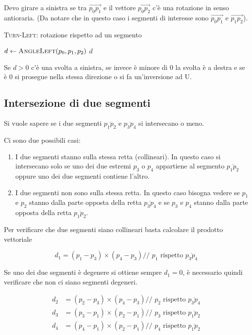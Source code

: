 Devo girare a sinistra se tra $\overrightarrow{p_0p_1}$ e il vettore $\overrightarrow{p_0p_2}$ c'è una rotazione in senso antioraria. (Da notare che in questo caso i segmenti di interesse sono $\overrightarrow{p_0p_1}$ e $\overrightarrow{p_1p_2}$).

\begin{breakablealgorithm}
	\caption{\textsc{Turn-Left}: rotazione rispetto ad un segmento}
	\begin{algorithmic}[1]
			\State $d \gets \textsc{AngleLeft}(p_0,p_1,p_2)$
			\State \Return $d$
		\EndFunction
	\end{algorithmic}
\end{breakablealgorithm}

Se $d >0 $ c'è una svolta a sinistra, se invece è minore di 0 la svolta è a destra e se è 0 si prosegue nella stessa direzione o si fa un'inversione ad U.

\subsection{Intersezione di due segmenti}\label{intersezione-di-due-segmenti}

Si vuole sapere se i due segmenti $\overline{p_1p_2}$ e $\overline{p_3p_4}$ si intersecano o meno.

Ci sono due possibili casi:

\begin{enumerate}
\item
  I due segmenti stanno sulla stessa retta (collineari). In questo caso si intersecano solo se uno dei due estremi $p_3$ o $p_4$ appartiene al segmento $\overline{p_1p_2}$ oppure uno dei due segmenti contiene l'altro.
\item
  I due segmenti non sono sulla stessa retta. In questo caso bisogna vedere se $p_1$ e $p_2$ stanno dalla parte opposta della retta $\overline{p_3p_4}$ e se $p_3$  e $p_4$ stanno dalla parte opposta della retta $\overline{p_1p_2}$.
\end{enumerate}

Per verificare che due segmenti siano collineari basta calcolare il prodotto vettoriale

$$
d_1 = (p_1-p_3) \times (p_4-p_3) \text{// } p_1\text{ rispetto } \overline{p_3p_4}
$$

Se uno dei due segmenti è degenere si ottiene sempre $d_1 = 0$, è necessario quindi verificare che non ci siano segmenti degeneri.

\begin{align*}
d_2 &= (p_2-p_3) \times (p_4-p_3) \text{// } p_2\text{ rispetto } \overline{p_3p_4}\\
d_3 &= (p_3-p_1) \times (p_2-p_1) \text{// } p_3\text{ rispetto } \overline{p_1p_2} \\
d_4 &= (p_4-p_1) \times (p_2-p_1) \text{// } p_4\text{ rispetto } \overline{p_1p_2}
\end{align*}

